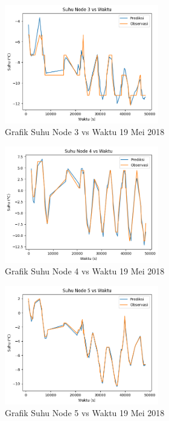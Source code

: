 \begin{figure}[H]
\setlength{}
\begin{center}
\includegraphics[width=0.6\textwidth]{fig/node3_temp_2018-05-19.png}
\caption{Grafik Suhu Node 3 vs Waktu 19 Mei 2018}
\label{fig:node319}
\end{center}
\end{figure}

\begin{figure}[H]
\setlength{}
\begin{center}
\includegraphics[width=0.6\textwidth]{fig/node4_temp_2018-05-19.png}
\caption{Grafik Suhu Node 4 vs Waktu 19 Mei 2018}
\label{fig:node419}
\end{center}
\end{figure}

\begin{figure}[H]
\setlength{}
\begin{center}
\includegraphics[width=0.6\textwidth]{fig/node5_temp_2018-05-19.png}
\caption{Grafik Suhu Node 5 vs Waktu 19 Mei 2018}
\label{fig:node519}
\end{center}
\end{figure}

